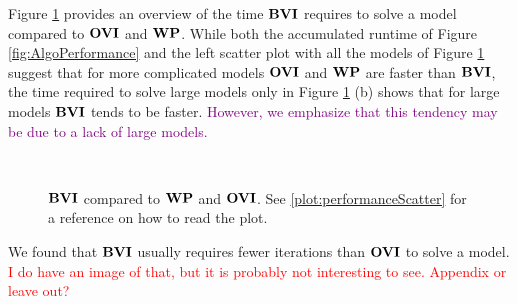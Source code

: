 Figure \ref{fig:BVIvsWPvsOVI} provides an overview of the time $\mathbf{BVI}$ requires to solve a model compared to $\mathbf{OVI}$ and $\mathbf{WP}$.
While both the accumulated runtime of Figure \ref{fig:AlgoPerformance} and the left scatter plot with all the models of Figure \ref{fig:BVIvsWPvsOVI}
suggest that for more complicated models $\mathbf{OVI}$ and $\mathbf{WP}$ are faster than $\mathbf{BVI}$, the time required to solve large models only in Figure \ref{fig:BVIvsWPvsOVI} (b)
shows that for large models $\mathbf{BVI}$ tends to be faster. \textcolor{purple}{However, we emphasize that this tendency may be due to a lack of large models.}

\begin{figure}[h!]
    \centering
    \
    \caption{$\mathbf{BVI}$ compared to $\mathbf{WP}$ and $\mathbf{OVI}$. See \ref{plot:performanceScatter} for a reference on how to read the plot.}%
    \label{fig:BVIvsWPvsOVI}%
    \end{figure}
\FloatBarrier

We found that $\mathbf{BVI}$ usually requires fewer iterations than $\mathbf{OVI}$ to solve a model. 
\textcolor{red}{I do have an image of that, but it is probably not interesting to see. Appendix or leave out?}

